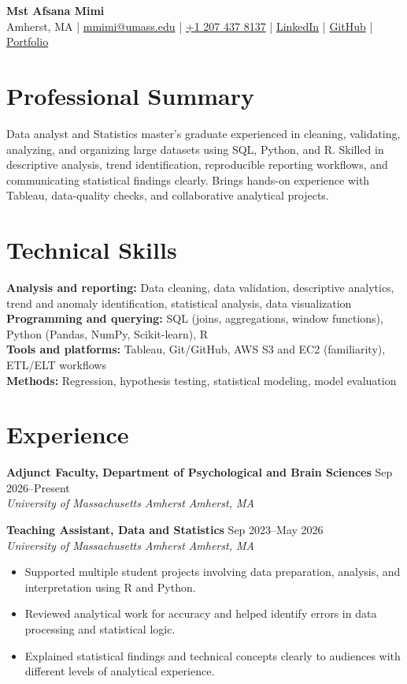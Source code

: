 \documentclass[10pt,letterpaper]{article}
\newcommand{\role}[4]{%
  \textbf{#1} \hfill #2\\
  \textit{#3} \hfill \textit{#4}
}
\begin{document}
\begin{center}
  {\LARGE\textbf{Mst Afsana Mimi}}\\[3pt]
  Amherst, MA \;|\;
  \href{mailto:mmimi@umass.edu}{mmimi@umass.edu} \;|\;
  \href{tel:+12074378137}{+1 207 437 8137} \;|\;
  \href{https://www.linkedin.com/in/mst-afsana-mimi-578234b1/}{LinkedIn} \;|\;
  \href{https://github.com/mstafsanamimi}{GitHub} \;|\;
  \href{https://mstafsanamimi.github.io/}{Portfolio}
\end{center}

\section{Professional Summary}
Data analyst and Statistics master's graduate experienced in cleaning, validating, analyzing, and organizing large datasets using SQL, Python, and R. Skilled in descriptive analysis, trend identification, reproducible reporting workflows, and communicating statistical findings clearly. Brings hands-on experience with Tableau, data-quality checks, and collaborative analytical projects.

\section{Technical Skills}
\textbf{Analysis and reporting:} Data cleaning, data validation, descriptive analytics, trend and anomaly identification, statistical analysis, data visualization\\
\textbf{Programming and querying:} SQL (joins, aggregations, window functions), Python (Pandas, NumPy, Scikit-learn), R\\
\textbf{Tools and platforms:} Tableau, Git/GitHub, AWS S3 and EC2 (familiarity), ETL/ELT workflows\\
\textbf{Methods:} Regression, hypothesis testing, statistical modeling, model evaluation

\section{Experience}
\role{Adjunct Faculty, Department of Psychological and Brain Sciences}{Sep 2026--Present}{University of Massachusetts Amherst}{Amherst, MA}

\vspace{2pt}
\role{Teaching Assistant, Data and Statistics}{Sep 2023--May 2026}{University of Massachusetts Amherst}{Amherst, MA}
\begin{itemize}
  \item Supported multiple student projects involving data preparation, analysis, and interpretation using R and Python.
  \item Reviewed analytical work for accuracy and helped identify errors in data processing and statistical logic.
  \item Explained statistical findings and technical concepts clearly to audiences with different levels of analytical experience.
\end{itemize}
\end{document}
